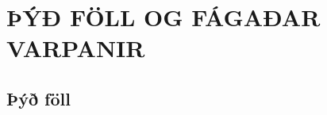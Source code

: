 \newenvironment{se}{\begin{setning+}\sl}{\hfill$\square$\end{setning+}\rm}
\newenvironment{sex}{\begin{setning+}\sl}{\hfill$\blacksquare$\end{setning+}\rm}
\newenvironment{sk}{\begin{skilgreining+}\rm}{\hfill$\square$\end{skilgreining+}\rm}
\newenvironment{sesk}{\begin{setningogskilgreining+}\rm}{\hfill$\square$\end{setningogskilgreining+}\rm}
\newenvironment{hs}{\begin{hjalparsetning+}\sl}{\hfill$\square$\end{hjalparsetning+}\rm}
\newenvironment{fs}{\begin{fylgisetning+}\sl}{\hfill$\square$\end{fylgisetning+}\rm}
\newenvironment{sy}{\begin{synidaemi+}\rm}{\hfill$\square$\end{synidaemi+}\rm}
\newenvironment{fo}{\begin{forrit+}\rm}{\hfill\end{forrit+}\rm}
\newenvironment{so}{\medbreak\noindent{\it Sönnun:}\rm}{\hfill$\blacksquare$\rm}
\newenvironment{sotx}[1]{\medbreak\noindent{\it #1:}\rm}{\hfill$\blacksquare$\rm}
\newcommand{\aefing}{\section{Æfingardæmi} \setcounter{daemateljari}{1}}
\newcommand{\daemi}{
{\medskip\noindent{\bf \thedaemateljari.}}
\addtocounter{daemateljari}{1}
}

\def\svar#1{\smallskip\noindent{\bf #1.} \ }
\def\lausn#1{\smallskip\noindent{\bf #1.} \ }
\def\ugrein#1{\medbreak\noindent{\bf #1.} }
\newcommand{\samantekt}{\noindent{\bf Samantekt.} }

\chapter{ÞÝÐ FÖLL OG FÁGAÐAR VARPANIR}


\section{Þýð föll}


